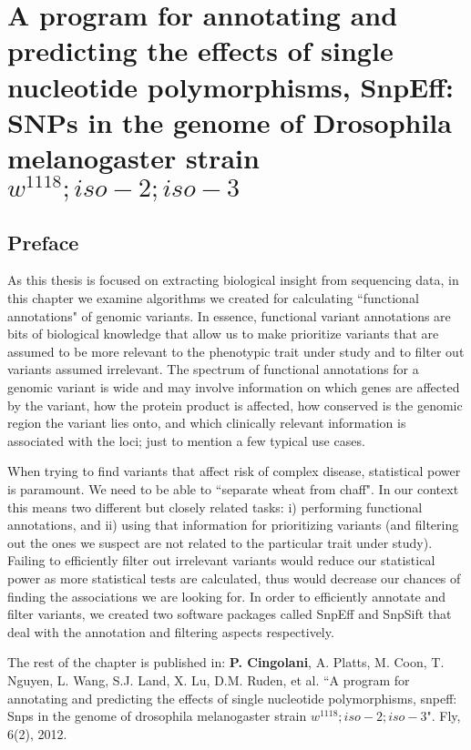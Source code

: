 
\chapter{A program for annotating and predicting the
effects of single nucleotide polymorphisms,
SnpEff: SNPs in the genome of Drosophila
melanogaster strain $w^{1118} ; iso-2; iso-3$\label{ch:snpeff}}

\section{Preface}

As this thesis is focused on extracting biological insight from sequencing data, in this chapter we examine algorithms we created for calculating ``functional annotations" of genomic variants. In essence, functional variant annotations are bits of biological knowledge that allow us to make prioritize variants that are assumed to be more relevant to the phenotypic trait under study and to filter out variants assumed irrelevant. The spectrum of functional annotations for a genomic variant is wide and may involve information on which genes are affected by the variant, how the protein product is affected, how conserved is the genomic region the variant lies onto, and which clinically relevant information is associated with the loci; just to mention a few typical use cases.

When trying to find variants that affect risk of complex disease, statistical power is paramount. We need to be able to ``separate wheat from chaff". In our context this means two different but closely related tasks: i) performing functional annotations, and ii) using that information for prioritizing variants (and filtering out the ones we suspect are not related to the particular trait under study). Failing to efficiently filter out irrelevant variants would reduce our statistical power as more statistical tests are calculated, thus would decrease our chances of finding the associations we are looking for. In order to efficiently annotate and filter variants, we created two software packages called SnpEff and SnpSift that deal with the annotation and filtering aspects respectively.

The rest of the chapter is published in: \textbf{P. Cingolani}, A. Platts, M. Coon, T. Nguyen, L. Wang, S.J. Land, X. Lu, D.M. Ruden, et al. ``A program for annotating and predicting the effects of single nucleotide polymorphisms, snpeff: Snps in the genome of drosophila melanogaster strain $w^{1118}; iso-2; iso-3$". Fly, 6(2), 2012.


